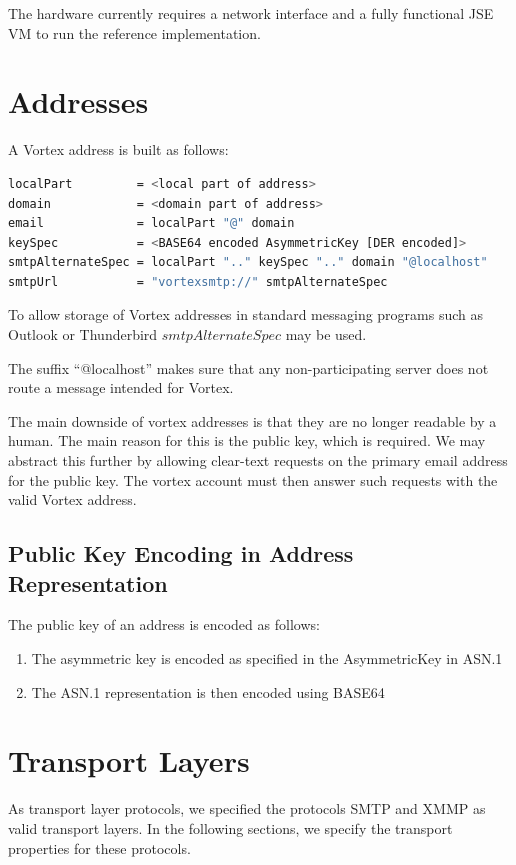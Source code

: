 The hardware currently requires a network interface and a fully functional JSE VM to run the reference implementation.

\section{Addresses}

A Vortex address is built as follows: 

\begin{lstlisting}[language=bash]
localPart         = <local part of address>
domain            = <domain part of address>
email             = localPart "@" domain
keySpec           = <BASE64 encoded AsymmetricKey [DER encoded]>
smtpAlternateSpec = localPart ".." keySpec ".." domain "@localhost"
smtpUrl           = "vortexsmtp://" smtpAlternateSpec
\end{lstlisting}

To allow storage of Vortex addresses in standard messaging programs such as Outlook or Thunderbird $smtpAlternateSpec$ may be used. 

The suffix ``@localhost'' makes sure that any non-participating server does not route a message intended for Vortex.

The main downside of vortex addresses is that they are no longer readable by a human. The main reason for this is the public key, which is required. We may abstract this further by allowing clear-text requests on the primary email address for the public key. The vortex account must then answer such requests with the valid Vortex address.

\subsection{Public Key Encoding in Address Representation}
The public key of an address is encoded as follows:
\begin{enumerate}
	\item The asymmetric key is encoded as specified in the AsymmetricKey in ASN.1
	\item The ASN.1 representation is then encoded using BASE64
\end{enumerate}    

\section{Transport Layers}                                          
As transport layer protocols, we specified the protocols SMTP and XMMP as valid transport layers. In the following sections, we specify the transport properties for these protocols.

